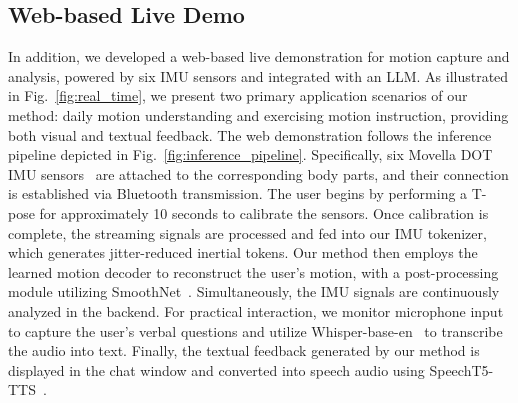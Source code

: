 \subsection{Web-based Live Demo}
In addition, we developed a web-based live demonstration for motion capture and analysis, powered by six IMU sensors and integrated with an LLM. As illustrated in Fig.~\ref{fig:real_time}, we present two primary application scenarios of our method: daily motion understanding and exercising motion instruction, providing both visual and textual feedback. The web demonstration follows the inference pipeline depicted in Fig.~\ref{fig:inference_pipeline}. Specifically, six Movella DOT IMU sensors~\cite{Movella} are attached to the corresponding body parts, and their connection is established via Bluetooth transmission. The user begins by performing a T-pose for approximately 10 seconds to calibrate the sensors. Once calibration is complete, the streaming signals are processed and fed into our IMU tokenizer, which generates jitter-reduced inertial tokens. Our method then employs the learned motion decoder to reconstruct the user's motion, with a post-processing module utilizing SmoothNet~\cite{zeng2022smoothnetplugandplaynetworkrefining}. Simultaneously, the IMU signals are continuously analyzed in the backend. For practical interaction, we monitor microphone input to capture the user's verbal questions and utilize Whisper-base-en~\cite{radford2023robust} to transcribe the audio into text. Finally, the textual feedback generated by our method is displayed in the chat window and converted into speech audio using SpeechT5-TTS~\cite{ao2021speecht5}.


